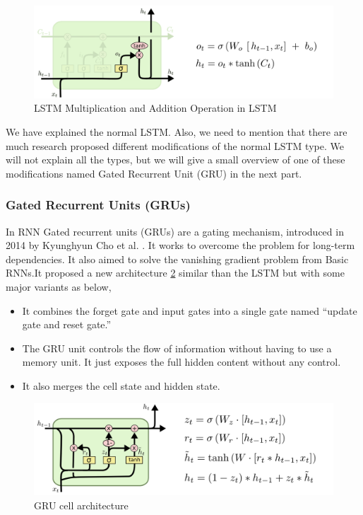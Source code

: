 \begin{itemize}
\begin{figure}[h!]
    \centering \includegraphics[width=\textwidth]{./Figures/Ch_2_Background/LSTM-output-gate.png}
        \caption{LSTM Multiplication and Addition Operation in LSTM \cite{colah}}
        \label{fig:LSTM-output-gate}
      \end{figure}


      
    \end{itemize}

    
    We have explained the normal LSTM. Also, we need to mention that there are much research proposed different modifications of the normal LSTM type. We will not explain all the types, but we will give a small overview of one of these modifications named Gated Recurrent Unit (GRU) in the next part.
\newpage
\subsubsection{Gated Recurrent Units (GRUs)}

In RNN Gated recurrent units (GRUs) are a gating mechanism, introduced in 2014 by Kyunghyun Cho et al. \cite{Cho_et_al}. It works to overcome the problem for long-term dependencies. It also aimed to solve the vanishing gradient problem from Basic RNNs.It proposed a new architecture \ref{fig:GRU} similar than the LSTM but with some major variants as below,
\begin{itemize}
  
\item It combines the forget gate and input gates into a single gate named “update gate and reset gate.”
\item The GRU unit controls the flow of information without having to use a memory unit. It just exposes the full hidden content without any control.
\item It also merges the cell state and hidden state.
  
\end{itemize}
\begin{figure}[h!]
  \centering
  \includegraphics[width=\textwidth]{./Figures/Ch_2_Background/GRU.png}
        \caption{GRU cell architecture \cite{colah}}
        \label{fig:GRU}
      \end{figure}



